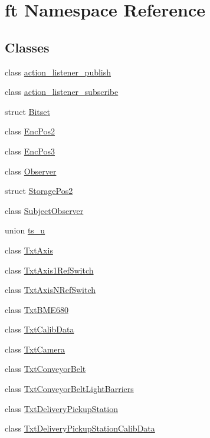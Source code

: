 \hypertarget{namespaceft}{}\section{ft Namespace Reference}
\label{namespaceft}
\subsection*{Classes}
\begin{DoxyCompactItemize}
\item 
class \hyperlink{classft_1_1action__listener__publish}{action\+\_\+listener\+\_\+publish}
\item 
class \hyperlink{classft_1_1action__listener__subscribe}{action\+\_\+listener\+\_\+subscribe}
\item 
struct \hyperlink{structft_1_1_bitset}{Bitset}
\item 
class \hyperlink{classft_1_1_enc_pos2}{Enc\+Pos2}
\item 
class \hyperlink{classft_1_1_enc_pos3}{Enc\+Pos3}
\item 
class \hyperlink{classft_1_1_observer}{Observer}
\item 
struct \hyperlink{structft_1_1_storage_pos2}{Storage\+Pos2}
\item 
class \hyperlink{classft_1_1_subject_observer}{Subject\+Observer}
\item 
union \hyperlink{unionft_1_1ts__u}{ts\+\_\+u}
\item 
class \hyperlink{classft_1_1_txt_axis}{Txt\+Axis}
\item 
class \hyperlink{classft_1_1_txt_axis1_ref_switch}{Txt\+Axis1\+Ref\+Switch}
\item 
class \hyperlink{classft_1_1_txt_axis_n_ref_switch}{Txt\+Axis\+N\+Ref\+Switch}
\item 
class \hyperlink{classft_1_1_txt_b_m_e680}{Txt\+B\+M\+E680}
\item 
class \hyperlink{classft_1_1_txt_calib_data}{Txt\+Calib\+Data}
\item 
class \hyperlink{classft_1_1_txt_camera}{Txt\+Camera}
\item 
class \hyperlink{classft_1_1_txt_conveyor_belt}{Txt\+Conveyor\+Belt}
\item 
class \hyperlink{classft_1_1_txt_conveyor_belt_light_barriers}{Txt\+Conveyor\+Belt\+Light\+Barriers}
\item 
class \hyperlink{classft_1_1_txt_delivery_pickup_station}{Txt\+Delivery\+Pickup\+Station}
\item 
class \hyperlink{classft_1_1_txt_delivery_pickup_station_calib_data}{Txt\+Delivery\+Pickup\+Station\+Calib\+Data}

\end{DoxyCompactItemize}
